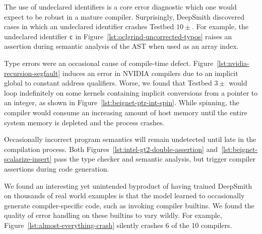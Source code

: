 
The use of undeclared identifiers is a core error diagnostic which one would expect to be robust in a mature compiler. Surprisingly, DeepSmith discovered cases in which an undeclared identifier crashes Testbed $10\pm$. For example, the undeclared identifier \texttt{c} in Figure~\ref{lst:oclgrind-uncorrected-typos} raises an assertion during semantic analysis of the AST when used as an array index.

Type errors were an occasional cause of compile-time defect. Figure~\ref{lst:nvidia-recursion-segfault} induces an error in NVIDIA compilers due to an implicit global to constant address qualifiers. Worse, we found that Testbed $3\pm$ would loop indefinitely on some kernels containing implicit conversions from a pointer to an integer, as shown in Figure~\ref{lst:beignet-ptr-int-spin}. While spinning, the compiler would consume an increasing amount of host memory until the entire system memory is depleted and the process crashes. %

Occasionally incorrect program semantics will remain undetected until late in the compilation process. Both Figures~\ref{lst:intel-gt2-double-assertion} and~\ref{lst:beignet-scalarize-insert} pass the type checker and semantic analysis, but trigger compiler assertions during code generation.

We found an interesting yet unintended byproduct of having trained DeepSmith on thousands of real world 
examples is that the model learned to occasionally generate compiler-specific code, such as invoking compiler builtins. We found the quality of error handling on these builtins to vary wildly. For example, Figure~\ref{lst:almost-everything-crash} silently crashes 6 of the 10 compilers.


